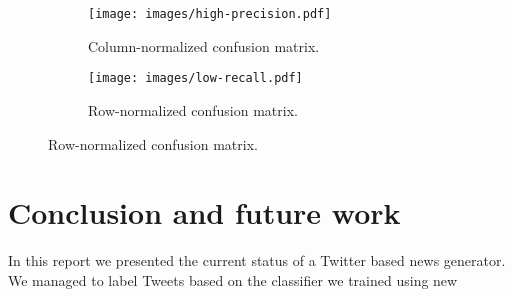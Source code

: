 \documentclass{llncs}
\begin{document}
\begin{figure}[H]
    \centering
    \begin{subfigure}[b]{0.48\textwidth}
        \texttt{[image: images/high-precision.pdf]}
        \caption{Column-normalized confusion matrix.}
        \label{fig:column-confusion-matrix}
    \end{subfigure}
    \begin{subfigure}[b]{0.48\textwidth}
        \texttt{[image: images/low-recall.pdf]}
        \caption{Row-normalized confusion matrix.}
        \label{fig:row-confusion-matrix}
    \end{subfigure}
 \end{figure}

\section{Conclusion and future work}
In this report we presented the current status of a Twitter based news generator. We managed to label Tweets based on the classifier we trained using new 



\end{document}
